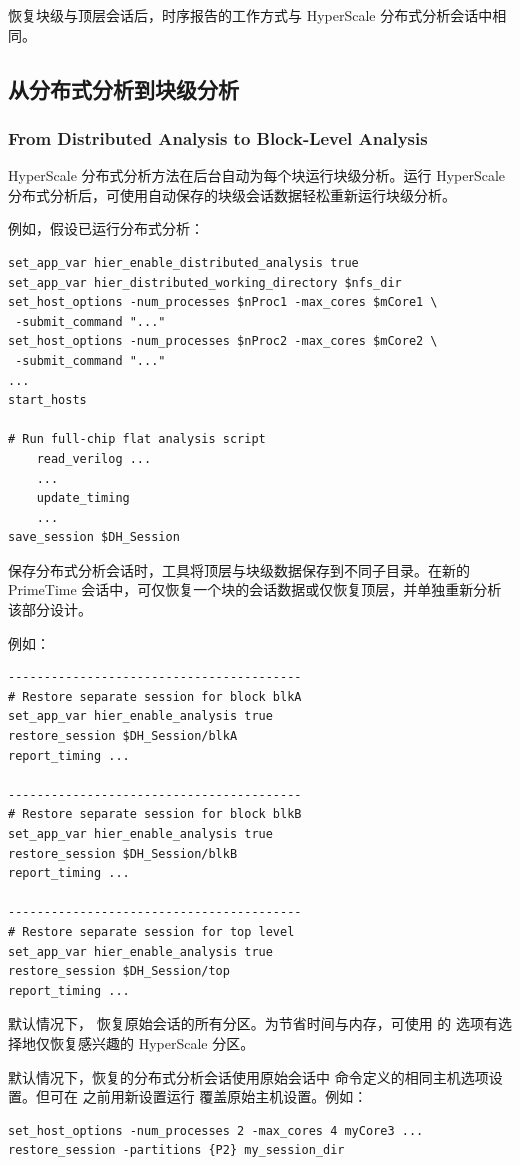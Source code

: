 恢复块级与顶层会话后，时序报告的工作方式与 HyperScale 分布式分析会话中相同。

\subsection{从分布式分析到块级分析}
\subsubsection*{From Distributed Analysis to Block-Level Analysis}

HyperScale 分布式分析方法在后台自动为每个块运行块级分析。运行 HyperScale 分布式分析后，可使用自动保存的块级会话数据轻松重新运行块级分析。

例如，假设已运行分布式分析：
\begin{lstlisting}
set_app_var hier_enable_distributed_analysis true
set_app_var hier_distributed_working_directory $nfs_dir
set_host_options -num_processes $nProc1 -max_cores $mCore1 \
 -submit_command "..."
set_host_options -num_processes $nProc2 -max_cores $mCore2 \
 -submit_command "..."
...
start_hosts

# Run full-chip flat analysis script
    read_verilog ...
    ...
    update_timing
    ...
save_session $DH_Session
\end{lstlisting}

保存分布式分析会话时，工具将顶层与块级数据保存到不同子目录。在新的 PrimeTime 会话中，可仅恢复一个块的会话数据或仅恢复顶层，并单独重新分析该部分设计。

例如：
\begin{lstlisting}
-----------------------------------------
# Restore separate session for block blkA
set_app_var hier_enable_analysis true
restore_session $DH_Session/blkA
report_timing ...

-----------------------------------------
# Restore separate session for block blkB
set_app_var hier_enable_analysis true
restore_session $DH_Session/blkB
report_timing ...

-----------------------------------------
# Restore separate session for top level
set_app_var hier_enable_analysis true
restore_session $DH_Session/top
report_timing ...
\end{lstlisting}

默认情况下， 恢复原始会话的所有分区。为节省时间与内存，可使用  的  选项有选择地仅恢复感兴趣的 HyperScale 分区。

默认情况下，恢复的分布式分析会话使用原始会话中  命令定义的相同主机选项设置。但可在 \cmd{restore\_session} 之前用新设置运行 \cmd{set\_host\_options} 覆盖原始主机设置。例如：
\begin{lstlisting}
set_host_options -num_processes 2 -max_cores 4 myCore3 ...
restore_session -partitions {P2} my_session_dir
\end{lstlisting}

